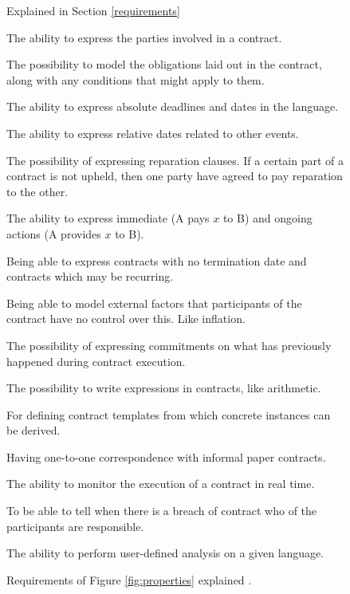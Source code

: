 \documentclass{ituthesis}
\begin{document}
\begin{appendices}
\begin{figure}[!h]
\begin{tcolorbox}[fontupper=\small]
\begin{list}{(R):~}{}
    \item Explained in Section \ref{requirements}
    \item The ability to express the parties involved in a contract.
    \item The possibility to model the obligations laid out in the contract, along with any conditions that might apply to them.
    \item The ability to express absolute deadlines and dates in the language.
    \item The ability to express relative dates related to other events.
    \item The possibility of expressing reparation clauses. If a certain part of a contract is not upheld, then one party have agreed to pay reparation to the other.
    \item The ability to express immediate (A pays $x$ to B) and ongoing actions (A provides $x$ to B).
    \item Being able to express contracts with no termination date and contracts which may be recurring.
    \item Being able to model external factors that participants of the contract have no control over this. Like inflation.
    \item The possibility of expressing commitments on what has previously happened during contract execution.
    \item The possibility to write expressions in contracts, like arithmetic.
    \item For defining contract templates from which concrete instances can be derived.
    \item Having one-to-one correspondence with informal paper contracts.
    \item The ability to monitor the execution of a contract in real time.
    \item To be able to tell when there is a breach of contract who of the participants are responsible.
    \item The ability to perform user-defined analysis on a given language.
\end{list}
\end{tcolorbox}
\caption{Requirements of Figure \ref{fig:properties} explained \cite{hvitved2011contract}.}
\label{fig:expl}
\end{figure}

\end{appendices}



\printbibliography
\end{document}
